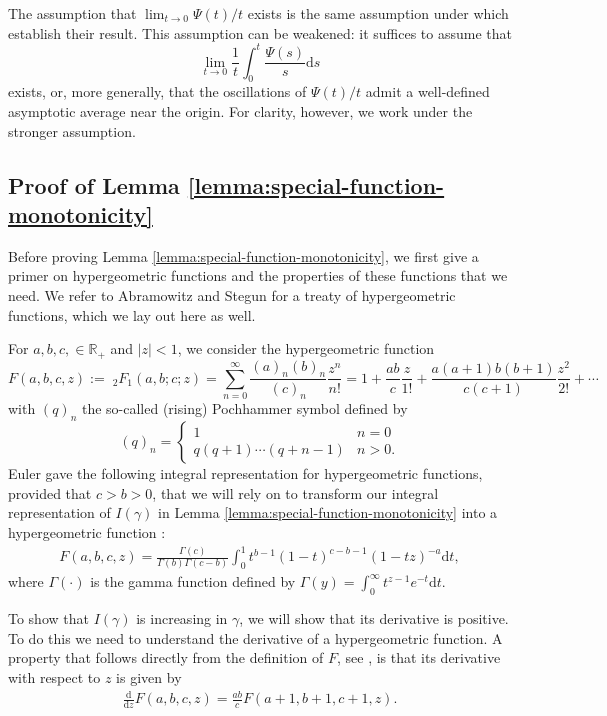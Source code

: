 \documentclass[11pt]{article}
\newcommand{\Rplus}{\mathbb{R}_+}
\newcommand{\dd}{\mathrm{d}}
\begin{document}
The assumption that $\lim_{t\to0}\Psi(t)/t$ exists is the same assumption under which \citet{allouah2022pricing} establish their result. This assumption can be weakened: it suffices to assume that
$$\lim_{t\to0}\frac{1}{t}\int_0^t\frac{\Psi(s)}{s}\dd s$$
exists, or, more generally, that the oscillations of $\Psi(t)/t$ admit a well-defined asymptotic average near the origin. For clarity, however, we work under the stronger assumption.


\subsection{Proof of Lemma \ref{lemma:special-function-monotonicity}}
\label{app:hyper-geometric}
Before proving Lemma \ref{lemma:special-function-monotonicity}, we first give a primer on hypergeometric functions and the properties of these functions that we need.
We refer to Abramowitz and Stegun \cite[Chapter 15]{abramowitz1948handbook} for a treaty of hypergeometric functions, which we lay out here as well.

For $a,b,c, \in \Rplus$ and $|z| < 1$, we consider the hypergeometric function 
$$
F(a,b,c,z) :=\;_2F_1(a,b;c;z) = \sum_{n=0}^\infty \frac{(a)_n (b)_n}{(c)_n} \frac{z^n}{n!} = 1 + \frac{ab}{c}\frac{z}{1!} + \frac{a(a+1)b(b+1)}{c(c+1)}\frac{z^2}{2!} + \cdots
$$
with $(q)_n$ the so-called (rising) Pochhammer symbol defined by
$$
(q)_n = \begin{cases}  1  & n = 0 \\
  q(q+1) \cdots (q+n-1) & n > 0.
 \end{cases}
$$
Euler gave the following integral representation for hypergeometric functions, provided that $c > b > 0$, that we will rely on to transform our integral representation of $I(\gamma)$ in Lemma \ref{lemma:special-function-monotonicity} into a hypergeometric function \cite[Equation 15.3.1]{abramowitz1948handbook}:
\begin{align}
    F(a,b,c,z)=\frac{\Gamma(c)}{\Gamma(b)\Gamma(c-b)}\int_0^1t^{b-1}(1-t)^{c-b-1}(1-tz)^{-a}\dd t,
    \label{eq:hyper-euler-type}
\end{align}
where $\Gamma(\cdot)$ is the gamma function defined by $\Gamma(y) = \int_0^\infty t^{z-1}e^{-t} \mathrm{d}t$.

To show that $I(\gamma)$ is increasing in $\gamma$, we will show that its derivative is positive. To do this we need to understand the derivative of a hypergeometric function. A property that follows directly from the definition of $F$, see \cite[Equation 15.2.1]{abramowitz1948handbook}, is that its derivative with respect to $z$ is given by
 \begin{align}
\frac{\dd }{\dd z} F(a,b,c,z)=\frac{ab}{c}F(a+1,b+1,c+1,z).
\label{eq:hyper-derivative}
\end{align}
\end{document}
